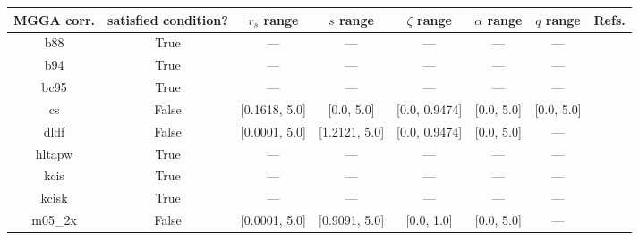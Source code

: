 \begin{tabular}{|c|c|c|c|c|c|c|l|}
\hline
   MGGA corr. &  satisfied condition? &      $r_s$ range &        $s$ range & $\zeta$ range & $\alpha$ range & $q$ range  &                                                                              Refs. \\ \hline
          b88 &                  True &              --- &              --- &           --- &            --- &        --- &                                                              \cite{Becke1988_1053} \\ \hline
          b94 &                  True &              --- &              --- &           --- &            --- &        --- &                                                               \cite{Becke1994_625} \\ \hline
         bc95 &                  True &              --- &              --- &           --- &            --- &        --- &                                                              \cite{Becke1996_1040} \\ \hline
           cs &                 False &    [0.1618, 5.0] &       [0.0, 5.0] & [0.0, 0.9474] &     [0.0, 5.0] & [0.0, 5.0] &                                                   \cite{Colle1975_329,Lee1988_785} \\ \hline
         dldf &                 False &    [0.0001, 5.0] &    [1.2121, 5.0] & [0.0, 0.9474] &     [0.0, 5.0] &        --- &                                                           \cite{Pernal2009_263201} \\ \hline
       hltapw &                  True &              --- &              --- &           --- &            --- &        --- &                                                             \cite{Lehtola2021_943} \\ \hline
         kcis &                  True &              --- &              --- &           --- &            --- &        --- & \cite{Rey1998_581,Krieger1999_463,Krieger2001_48,Kurth1999_889,Toulouse2002_10465} \\ \hline
        kcisk &                  True &              --- &              --- &           --- &            --- &        --- & \cite{Rey1998_581,Krieger1999_463,Krieger2001_48,Kurth1999_889,Toulouse2002_10465} \\ \hline
      m05\_2x &                 False &    [0.0001, 5.0] &    [0.9091, 5.0] &    [0.0, 1.0] &     [0.0, 5.0] &        --- &                                                                \cite{Zhao2006_364} \\ \hline

\end{tabular}
